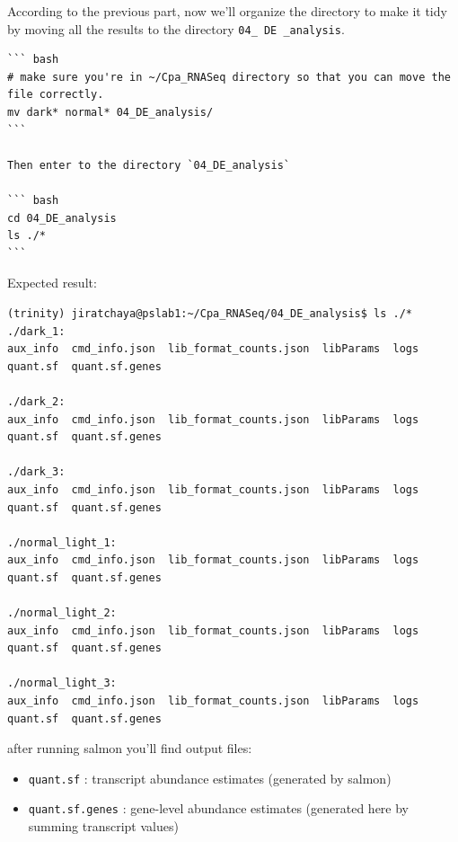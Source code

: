 \documentclass[
  letterpaper,
  DIV=11,
  numbers=noendperiod]{scrreprt}
\begin{document}
\begin{tcolorbox}[enhanced jigsaw, breakable, bottomrule=.15mm, left=2mm, coltitle=black, opacityback=0, colframe=quarto-callout-note-color-frame, toprule=.15mm, opacitybacktitle=0.6, colbacktitle=quarto-callout-note-color!10!white, bottomtitle=1mm, colback=white, toptitle=1mm, titlerule=0mm, rightrule=.15mm, arc=.35mm, title=\textcolor{quarto-callout-note-color}{\faInfo}\hspace{0.5em}{Activity}, leftrule=.75mm]

According to the previous part, now we'll organize the directory to make
it tidy by moving all the results to the directory
\texttt{04\_\ DE\ \_analysis}.

\begin{verbatim}
``` bash
# make sure you're in ~/Cpa_RNASeq directory so that you can move the file correctly. 
mv dark* normal* 04_DE_analysis/
```

Then enter to the directory `04_DE_analysis`

``` bash
cd 04_DE_analysis
ls ./*
```
\end{verbatim}

\end{tcolorbox}

Expected result:

\begin{verbatim}
(trinity) jiratchaya@pslab1:~/Cpa_RNASeq/04_DE_analysis$ ls ./*
./dark_1:
aux_info  cmd_info.json  lib_format_counts.json  libParams  logs  quant.sf  quant.sf.genes

./dark_2:
aux_info  cmd_info.json  lib_format_counts.json  libParams  logs  quant.sf  quant.sf.genes

./dark_3:
aux_info  cmd_info.json  lib_format_counts.json  libParams  logs  quant.sf  quant.sf.genes

./normal_light_1:
aux_info  cmd_info.json  lib_format_counts.json  libParams  logs  quant.sf  quant.sf.genes

./normal_light_2:
aux_info  cmd_info.json  lib_format_counts.json  libParams  logs  quant.sf  quant.sf.genes

./normal_light_3:
aux_info  cmd_info.json  lib_format_counts.json  libParams  logs  quant.sf  quant.sf.genes
\end{verbatim}

after running salmon you'll find output files:

\begin{itemize}
\item
  \texttt{quant.sf} : transcript abundance estimates (generated by
  salmon)
\item
  \texttt{quant.sf.genes} : gene-level abundance estimates (generated
  here by summing transcript values)
\end{itemize}
\end{document}
